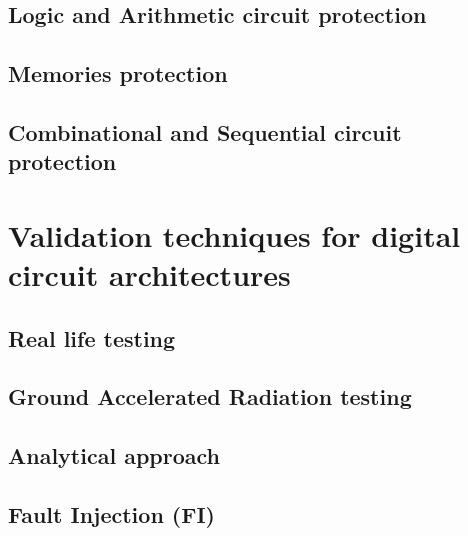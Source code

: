 {{{		}
		\subsection{Logic and Arithmetic circuit protection}{
			
		}
		\subsection{Memories protection}{
			
		}
		\subsection{Combinational and Sequential circuit protection}{
			
		}
	
	} %
	\section{Validation techniques for digital circuit architectures}{
		\subsection{Real life testing}{
			
		}
		\subsection{Ground Accelerated Radiation testing}{
			
		}
		\subsection{Analytical approach}{
			
		}
		\subsection{Fault Injection (FI)}{
			
		}
	}
}